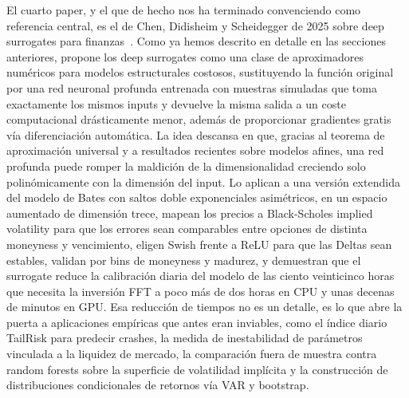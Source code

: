 \documentclass[11pt,a4paper]{article}
\begin{document}
El cuarto paper, y el que de hecho nos ha terminado convenciendo como referencia central, es el de Chen, Didisheim y Scheidegger de 2025 sobre deep surrogates para finanzas~\cite{chen2025}. Como ya hemos descrito en detalle en las secciones anteriores, propone los deep surrogates como una clase de aproximadores numéricos para modelos estructurales costosos, sustituyendo la función original por una red neuronal profunda entrenada con muestras simuladas que toma exactamente los mismos inputs y devuelve la misma salida a un coste computacional drásticamente menor, además de proporcionar gradientes gratis vía diferenciación automática. La idea descansa en que, gracias al teorema de aproximación universal y a resultados recientes sobre modelos afines, una red profunda puede romper la maldición de la dimensionalidad creciendo solo polinómicamente con la dimensión del input. Lo aplican a una versión extendida del modelo de Bates con saltos doble exponenciales asimétricos, en un espacio aumentado de dimensión trece, mapean los precios a Black-Scholes implied volatility para que los errores sean comparables entre opciones de distinta moneyness y vencimiento, eligen Swish frente a ReLU para que las Deltas sean estables, validan por bins de moneyness y madurez, y demuestran que el surrogate reduce la calibración diaria del modelo de las ciento veinticinco horas que necesita la inversión FFT a poco más de dos horas en CPU y unas decenas de minutos en GPU. Esa reducción de tiempos no es un detalle, es lo que abre la puerta a aplicaciones empíricas que antes eran inviables, como el índice diario TailRisk para predecir crashes, la medida de inestabilidad de parámetros vinculada a la liquidez de mercado, la comparación fuera de muestra contra random forests sobre la superficie de volatilidad implícita y la construcción de distribuciones condicionales de retornos vía VAR y bootstrap.
\end{document}
